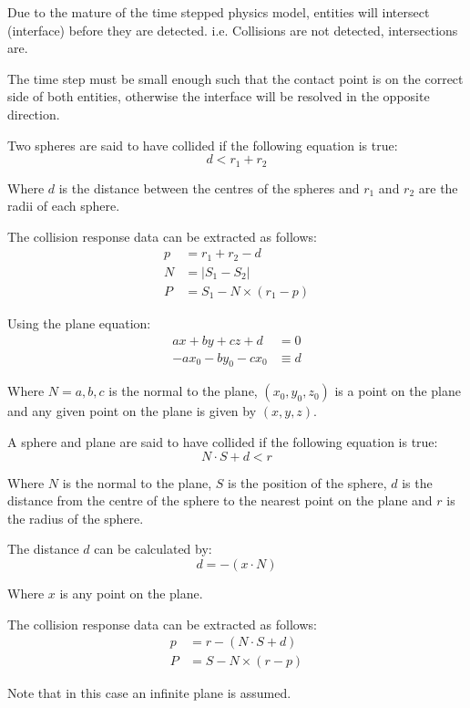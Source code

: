 \documentclass[a4paper]{article}
\begin{document}
Due to the mature of the time stepped physics model, entities will intersect
(interface) before they are detected. i.e. Collisions are not detected,
intersections are.

The time step must be small enough such that the contact point is on the correct
side of both entities, otherwise the interface will be resolved in the opposite
direction.


Two spheres are said to have collided if the following equation is true:
\[
  d < r_{1} + r_{2}
\]

Where $d$ is the distance between the centres of the spheres and $r_{1}$ and
$r_{2}$ are the radii of each sphere.

The collision response data can be extracted as follows:
\begin{align*}
  p &= r_{1} + r_{2} - d \\
  N &= |S_{1} - S_{2}| \\
  P &= S_{1} - N \times (r_{1} - p)
\end{align*}


Using the plane equation:
\begin{align*}
  ax + by + cz + d &= 0 \\
  - ax_{0} - by_{0} - cx_{0} &\equiv d
\end{align*}

Where $N = {a, b, c}$ is the normal to the plane, $(x_{0}, y_{0}, z_{0})$ is a
point on the plane and any given point on the plane is given by $(x, y, z)$.

A sphere and plane are said to have collided if the following equation is true:
\[
  N \cdot S + d < r
\]

Where $N$ is the normal to the plane, $S$ is the position of the sphere, $d$ is
the distance from the centre of the sphere to the nearest point on the plane and
$r$ is the radius of the sphere.

The distance $d$ can be calculated by:
\[
  d = -(x \cdot N)
\]

Where $x$ is any point on the plane.

The collision response data can be extracted as follows:
\begin{align*}
  p &= r - (N \cdot S + d) \\
  P &= S - N \times (r - p)
\end{align*}

Note that in this case an infinite plane is assumed.
\end{document}

